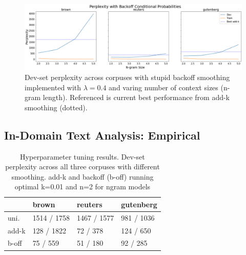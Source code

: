 \documentclass[11pt,a4paper]{article}
\begin{document}
\begin{figure}[htpb]
  \centering
  \includegraphics[width=1\linewidth]{imgs/backoff.png}
  \caption{Dev-set perplexity across corpuses with stupid backoff
  smoothing implemented with $\lambda=0.4$ and varing number of
  context sizes (n-gram length). Referenced is current best 
performance from add-k smoothing (dotted).}
  \label{fig:backoff}
\end{figure}



\subsection{In-Domain Text Analysis: Empirical}%
\label{sec:in_domain_text_analysis_empirical}


\begin{table}
\begin{tabular}{llll}
\hline
         & brown       & reuters     & gutenberg   \\
\hline
 uni. & 1514 / 1758 & 1467 / 1577 & 981 / 1036  \\
 add-k   & 128 / 1822  & 72 / 378    & 124 / 650   \\
 b-off & 75 / 559    & 51 / 180    & 92 / 285    \\
\hline
\end{tabular}
\caption{Hyperparameter tuning results. Dev-set perplexity across
all three corpuses with different smoothing. add-k and backoff (b-off) 
running optimal k=0.01 and n=2 for ngram models}
\label{table:hyperparameter}
\end{table}


\end{document}
